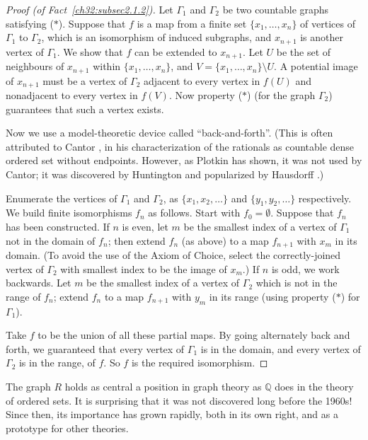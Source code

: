 \documentclass{book}
\begin{document}
\begin{proof}[Proof (of Fact~\ref{ch32:subsec2.1.2})]
Let $\Gamma_1$ and
$\Gamma_2$ be two countable graphs satisfying ($\ast$). Suppose that
$f$ is a map from a finite set $\{x_1,\ldots, x_n\}$ of vertices of
$\Gamma_1$ to $\Gamma_2$, which is an isomorphism of induced
subgraphs, and $x_{n+1}$ is another vertex of $\Gamma_1$. We show
that $f$ can be extended to $x_{n+1}$. Let $U$ be the set of
neighbours of $x_{n+1}$ within $\{x_1,\ldots, x_n\}$, and $V =
\{x_1,\ldots, x_n\} \setminus U$. A potential image of $x_{n+1}$
must be a vertex of $\Gamma_2$ adjacent to every vertex in 
$f(U)$ and nonadjacent to every vertex in $f(V)$. Now property
($\ast$) (for the graph $\Gamma_2$) guarantees that such a vertex
exists.

Now we use a model-theoretic device called ``back-and-forth''. (This
is often attributed to Cantor \cite{ch32:bib11}, in his
characterization of the rationals as countable dense ordered set
without endpoints. However, as Plotkin \cite{ch32:bib41} has shown,
it was not used by Cantor; it was discovered by Huntington
\cite{ch32:bib32} and popularized by Hausdorff \cite{ch32:bib25}.)

Enumerate the vertices of $\Gamma_1$ and $\Gamma_2$, as $\{x_1,
x_2, \ldots\}$ and $\{y_1, y_2, \ldots\}$ respectively. We build
finite isomorphisms $f_n$ as follows. Start with $f_0 = \emptyset$.
Suppose that $f_n$ has been constructed. If $n$ is even, let $m$ be
the smallest index of a vertex of $\Gamma_1$ not in the domain of
$f_n$; then extend $f_n$ (as above) to a map $f_{n+1}$ with $x_m$ in
its domain. (To avoid the use of the Axiom of Choice, select the
correctly-joined vertex of $\Gamma_2$ with smallest index to be the
image of $x_m$.) If $n$ is odd, we work backwards. Let $m$ be the
smallest index of a vertex of $\Gamma_2$ which is not in the range
of $f_n$; extend $f_n$ to a map $f_{n+1}$ with $y_m$ in its range
(using property ($\ast$) for $\Gamma_1$).

Take $f$ to be the union of all these partial maps. By going
alternately back and forth, we guaranteed that every vertex of
$\Gamma_1$ is in the domain, and every vertex of $\Gamma_2$ is in
the range, of $f$. So $f$ is the required isomorphism.
\end{proof}

The graph $R$ holds as central a position in graph theory as
$\mathbb{Q}$ does in the theory of ordered sets. It is surprising
that it was not discovered long before the 1960s! Since then, its
importance has grown rapidly, both in its own right, and as a prototype
for other theories.
\end{document}
